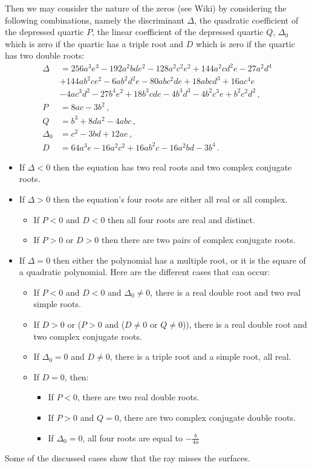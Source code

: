 \documentclass[12pt,a4paper,twoside,openright,BCOR10mm,headsepline,titlepage,abstracton,chapterprefix,final]{scrreprt}
\begin{document}
Then we may consider the nature of the zeros (see Wiki) by considering the following combinations, namely
the discriminant $\Delta$, the quadratic coefficient of the depressed quartic $P$, the linear coefficient of
the depressed quartic $Q$, $\Delta_0$ which is zero if the quartic has a triple root and $D$ which is zero
if the quartic has two double roots:
\begin{subequations}
 \begin{align}
  \Delta &= 256 a^3 e^3 - 192 a^2 b d e^2 - 128 a^2 c^2 e^2 + 144 a^2 c d^2 e - 27 a^2 d^4 \nonumber\\ 
&+ 144 a b^2 c e^2 - 6 a b^2 d^2 e - 80 a b c^2 d e + 18 a b c d^3 + 16 a c^4 e \nonumber\\
&- 4 a c^3 d^2 - 27 b^4 e^2 + 18 b^3 c d e - 4 b^3 d^3 - 4 b^2 c^3 e + b^2 c^2 d^2\,,\\
   P &= 8ac - 3b^2\,,\\
   Q &= b^3+8da^2-4abc\,,\\
   \Delta_0 &= c^2 - 3bd + 12ae\,,\\
   D &= 64 a^3 e - 16 a^2 c^2 + 16 a b^2 c - 16 a^2 bd - 3 b^4\,.
 \end{align}
\end{subequations}

\begin{itemize}
\item If $\Delta < 0$  then the equation has two real roots and two complex conjugate roots.
\item If $\Delta > 0$  then the equation's four roots are either all real or all complex.
\begin{itemize}
\item If $P < 0$ and $D < 0$ then all four roots are real and distinct.
\item If $P > 0$ or $D > 0$ then there are two pairs of complex conjugate roots.
\end{itemize}
\item If $\Delta = 0$  then either the polynomial has a multiple root, 
  or it is the square of a quadratic polynomial. Here are the different cases that can occur:
  \begin{itemize}
\item If $P < 0$ and $D < 0$ and $\Delta_0\ne0$, there is a real double root and two real simple roots.
\item If $D > 0$ or ($P > 0$ and ($D \ne 0$ or $Q \ne 0$)), there is a real double root and two complex conjugate roots.
\item If $\Delta_0 = 0$ and $D \ne 0$, there is a triple root and a simple root, all real.
\item If $D = 0$, then:
  \begin{itemize}
\item If $P < 0$, there are two real double roots.
\item If $P > 0$ and $Q = 0$, there are two complex conjugate double roots.
\item If $ \Delta_0  = 0$, all four roots are equal to $-\frac{b}{4a}$
  \end{itemize}
  \end{itemize}
\end{itemize}
Some of the discussed cases show that the ray misses the surfaces.
\fi
\end{document}
